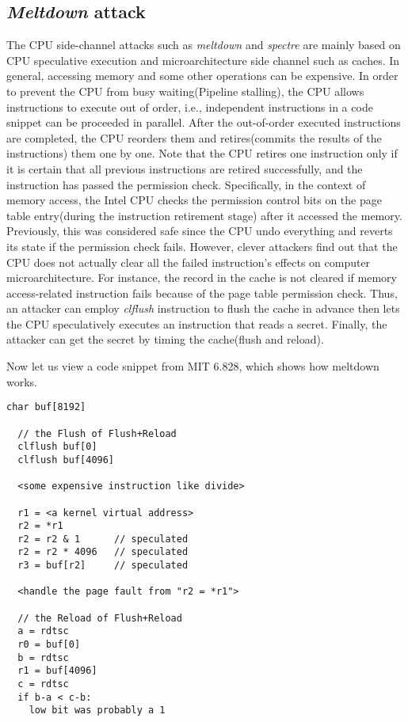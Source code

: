  
 
 
 

 

 




 
 
\subsection{\emph{Meltdown} attack}

The CPU side-channel attacks such as \emph{meltdown} and \emph{spectre} are mainly based on 
CPU speculative execution and microarchitecture side channel such as caches. 
In general, accessing memory and some other operations can be expensive. 
In order to prevent the CPU from busy waiting(Pipeline stalling), 
the CPU allows instructions to execute out of order, i.e., independent 
instructions in a code snippet can be proceeded in parallel. After the out-of-order 
executed instructions are completed,  the CPU reorders them and retires(commits the 
results of the instructions) them one by one. Note that the CPU retires one instruction 
only if it is certain that all previous instructions are retired successfully, and the 
instruction has passed the permission check.  Specifically, in the context of memory access, 
the Intel CPU checks the permission control bits on the page table entry(during the 
instruction retirement stage) after it accessed the memory. 
Previously, this was considered safe since the CPU undo everything and reverts 
its state if the permission check fails.
However, clever attackers find out that the CPU does not actually clear all the 
failed instruction's effects on computer microarchitecture. For instance, 
the record in the cache is not cleared if memory access-related instruction 
fails because of the page table permission check. Thus, an attacker can employ 
\emph{clflush} instruction to flush the cache in advance then lets the CPU speculatively 
executes an instruction that reads a secret. Finally, the attacker can get the secret 
by timing the cache(flush and reload).

Now let us view a code snippet from MIT 6.828\cite{1}, which shows how meltdown works. 
\begin{lstlisting}[style=CStyle]
  char buf[8192]

  // the Flush of Flush+Reload
  clflush buf[0]
  clflush buf[4096]

  <some expensive instruction like divide>

  r1 = <a kernel virtual address>
  r2 = *r1
  r2 = r2 & 1      // speculated
  r2 = r2 * 4096   // speculated
  r3 = buf[r2]     // speculated

  <handle the page fault from "r2 = *r1">

  // the Reload of Flush+Reload
  a = rdtsc
  r0 = buf[0]
  b = rdtsc
  r1 = buf[4096]
  c = rdtsc
  if b-a < c-b:
    low bit was probably a 1
\end{lstlisting}

